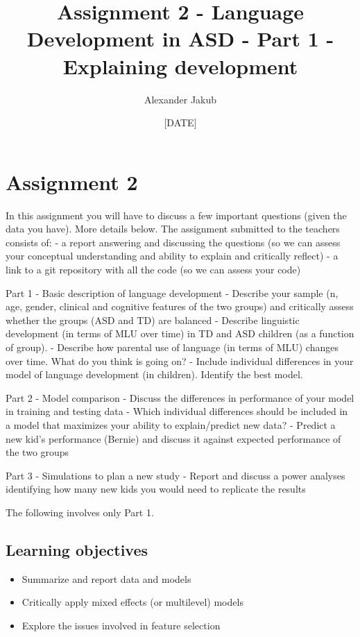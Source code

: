 \documentclass[]{article}
\title{Assignment 2 - Language Development in ASD - Part 1 - Explaining
development}
\author{Alexander Jakub}
\date{{[}DATE{]}}
\providecommand{\tightlist}{%
  \setlength{\itemsep}{0pt}\setlength{\parskip}{0pt}}
\begin{document}
\maketitle

\section{Assignment 2}\label{assignment-2}

In this assignment you will have to discuss a few important questions
(given the data you have). More details below. The assignment submitted
to the teachers consists of: - a report answering and discussing the
questions (so we can assess your conceptual understanding and ability to
explain and critically reflect) - a link to a git repository with all
the code (so we can assess your code)

Part 1 - Basic description of language development - Describe your
sample (n, age, gender, clinical and cognitive features of the two
groups) and critically assess whether the groups (ASD and TD) are
balanced - Describe linguistic development (in terms of MLU over time)
in TD and ASD children (as a function of group). - Describe how parental
use of language (in terms of MLU) changes over time. What do you think
is going on? - Include individual differences in your model of language
development (in children). Identify the best model.

Part 2 - Model comparison - Discuss the differences in performance of
your model in training and testing data - Which individual differences
should be included in a model that maximizes your ability to
explain/predict new data? - Predict a new kid's performance (Bernie) and
discuss it against expected performance of the two groups

Part 3 - Simulations to plan a new study - Report and discuss a power
analyses identifying how many new kids you would need to replicate the
results

The following involves only Part 1.

\subsection{Learning objectives}\label{learning-objectives}

\begin{itemize}
\tightlist
\item
  Summarize and report data and models
\item
  Critically apply mixed effects (or multilevel) models
\item
  Explore the issues involved in feature selection
\end{itemize}
\end{document}
